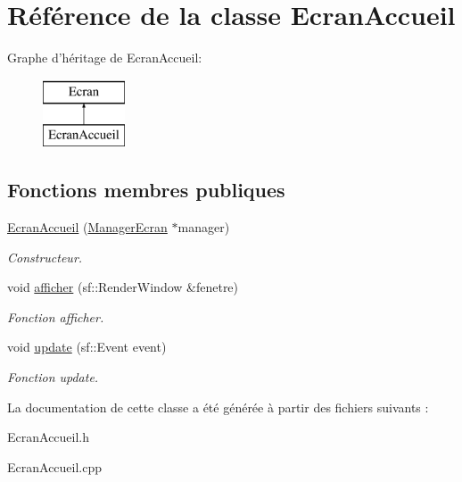 \hypertarget{classEcranAccueil}{\section{\-Référence de la classe \-Ecran\-Accueil}
\label{classEcranAccueil}
}
\-Graphe d'héritage de \-Ecran\-Accueil\-:\begin{figure}[H]
\begin{center}
\leavevmode
\includegraphics[height=2.000000cm]{classEcranAccueil}
\end{center}
\end{figure}
\subsection*{\-Fonctions membres publiques}
\begin{DoxyCompactItemize}
\item 
\hypertarget{classEcranAccueil_a53449fe44e756cbfe0d19c372fab9783}{\hyperlink{classEcranAccueil_a53449fe44e756cbfe0d19c372fab9783}{\-Ecran\-Accueil} (\hyperlink{classManagerEcran}{\-Manager\-Ecran} $\ast$manager)}\label{classEcranAccueil_a53449fe44e756cbfe0d19c372fab9783}

\begin{DoxyCompactList}\small\item\em \-Constructeur. \end{DoxyCompactList}\item 
\hypertarget{classEcranAccueil_acc1f211002209380daa8d13f5664c118}{void \hyperlink{classEcranAccueil_acc1f211002209380daa8d13f5664c118}{afficher} (sf\-::\-Render\-Window \&fenetre)}\label{classEcranAccueil_acc1f211002209380daa8d13f5664c118}

\begin{DoxyCompactList}\small\item\em \-Fonction afficher. \end{DoxyCompactList}\item 
\hypertarget{classEcranAccueil_ac03953623402740bab58ab7fbb54fc3a}{void \hyperlink{classEcranAccueil_ac03953623402740bab58ab7fbb54fc3a}{update} (sf\-::\-Event event)}\label{classEcranAccueil_ac03953623402740bab58ab7fbb54fc3a}

\begin{DoxyCompactList}\small\item\em \-Fonction update. \end{DoxyCompactList}\end{DoxyCompactItemize}


\-La documentation de cette classe a été générée à partir des fichiers suivants \-:\begin{DoxyCompactItemize}
\item 
\-Ecran\-Accueil.\-h\item 
\-Ecran\-Accueil.\-cpp\end{DoxyCompactItemize}
